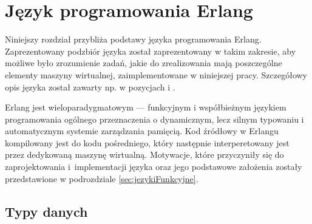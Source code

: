 \chapter{Język programowania Erlang}
\label{cha:erlang}

Niniejszy rozdział przybliża podstawy języka programowania Erlang.
Zaprezentowany podzbiór języka został zaprezentowany w takim zakresie, aby możliwe było zrozumienie zadań, jakie do zrealizowania mają poszczególne elementy maszyny wirtualnej, zaimplementowane w niniejszej pracy.
Szczegółowy opis języka został zawarty np. w pozycjach \cite{Armstrong2013} i \cite{Hebert2013}.


Erlang jest wieloparadygmatowym --- funkcyjnym i współbieżnym językiem programowania ogólnego przeznaczenia o dynamicznym, lecz silnym typowaniu i automatycznym systemie zarządzania pamięcią.
Kod źródłowy w Erlangu kompilowany jest do kodu pośredniego, który następnie interperetowany jest przez dedykowaną maszynę wirtualną.
Motywacje, które przyczyniły się do zaprojektowania i~implementacji języka oraz jego podstawowe założenia zostały przedstawione w podrozdziale \ref{sec:jezykiFunkcyjne}.

\section{Typy danych}
\label{sec:erlangTypy}

